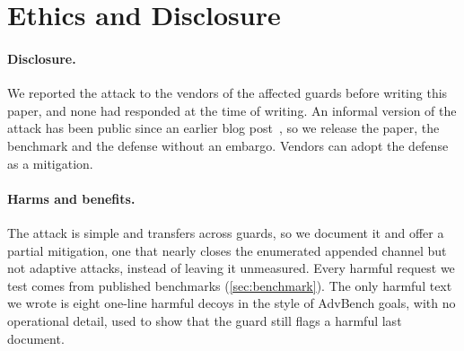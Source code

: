 \section{Ethics and Disclosure}
\label{sec:ethics}

\paragraph{Disclosure.}
We reported the attack to the vendors of the affected guards before writing this paper, and none had responded at the time of writing.
An informal version of the attack has been public since an earlier blog post~\citep{kanwat2026blog}, so we release the paper, the benchmark and the defense without an embargo. Vendors can adopt the defense as a mitigation.

\paragraph{Harms and benefits.}
The attack is simple and transfers across guards, so we document it and offer a partial mitigation, one that nearly closes the enumerated appended channel but not adaptive attacks, instead of leaving it unmeasured.
Every harmful request we test comes from published benchmarks (\cref{sec:benchmark}). The only harmful text we wrote is eight one-line harmful decoys in the style of AdvBench goals, with no operational detail, used to show that the guard still flags a harmful last document. %
